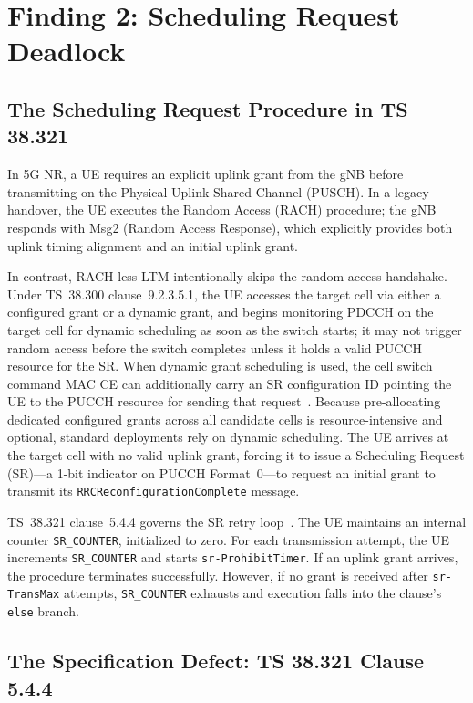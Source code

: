 \chapter{Finding 2: Scheduling Request Deadlock}
\label{ch:m2}

\section{The Scheduling Request Procedure in TS 38.321}
\label{sec:m2proc}

In 5G NR, a UE requires an explicit uplink grant from the gNB before transmitting on the Physical Uplink
Shared Channel (PUSCH). In a legacy handover, the UE executes the Random Access (RACH) procedure; the
gNB responds with Msg2 (Random Access Response), which explicitly provides both uplink timing alignment
and an initial uplink grant.

In contrast, RACH-less LTM intentionally skips the random access handshake. Under TS~38.300
clause~9.2.3.5.1, the UE accesses the target cell via either a configured grant or a dynamic grant, and
begins monitoring PDCCH on the target cell for dynamic scheduling as soon as the switch starts; it may
not trigger random access before the switch completes unless it holds a valid PUCCH resource for the
SR. When dynamic grant scheduling is used, the cell switch command MAC CE can additionally carry an SR
configuration ID pointing the UE to the PUCCH resource for sending that request~\cite{3gpp38300}.
Because pre-allocating dedicated configured grants across all candidate cells is resource-intensive and
optional, standard deployments rely on dynamic scheduling. The UE arrives at the target cell with
no valid uplink grant, forcing it to issue a Scheduling Request (SR)---a 1-bit indicator on
PUCCH Format~0---to request an initial grant to transmit its \texttt{RRCReconfigurationComplete} message.

TS~38.321 clause~5.4.4 governs the SR retry loop~\cite{3gpp38321}. The UE maintains an internal counter
\texttt{SR\_COUNTER}, initialized to zero. For each transmission attempt, the UE increments \texttt{SR\_COUNTER}
and starts \texttt{sr-ProhibitTimer}. If an uplink grant arrives, the procedure terminates successfully.
However, if no grant is received after \texttt{sr-TransMax} attempts, \texttt{SR\_COUNTER} exhausts and
execution falls into the clause's \texttt{else} branch.

\section{The Specification Defect: TS 38.321 Clause 5.4.4}
\label{sec:m2gap}

